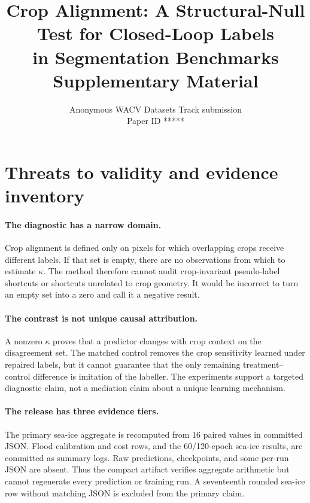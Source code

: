 \documentclass[10pt,twocolumn,letterpaper]{article}
\def\wacvPaperID{*****}
\def\confName{WACV}
\newcommand{\kap}{\kappa}
\begin{document}
\title{Crop Alignment: A Structural-Null Test for Closed-Loop Labels\\
in Segmentation Benchmarks\\
\vspace{4pt}\Large Supplementary Material}
\author{Anonymous \confName{} Datasets Track submission\\Paper ID \wacvPaperID}
\maketitle

\section{Threats to validity and evidence inventory}

\paragraph{The diagnostic has a narrow domain.} Crop alignment is defined only on
pixels for which overlapping crops receive different labels. If that set is empty,
there are no observations from which to estimate $\kap$. The method therefore
cannot audit crop-invariant pseudo-label shortcuts or shortcuts unrelated to crop
geometry. It would be incorrect to turn an empty set into a zero and call it a
negative result.

\paragraph{The contrast is not unique causal attribution.} A nonzero $\kap$ proves
that a predictor changes with crop context on the disagreement set. The matched
control removes the crop sensitivity learned under repaired labels, but it cannot
guarantee that the only remaining treatment--control difference is imitation of the
labeller. The experiments support a targeted diagnostic claim, not a mediation
claim about a unique learning mechanism.

\paragraph{The release has three evidence tiers.} The primary sea-ice aggregate is
recomputed from 16 paired values in committed JSON. Flood calibration and cost rows,
and the 60/120-epoch sea-ice results, are committed as summary logs. Raw predictions,
checkpoints, and some per-run JSON are absent. Thus the compact artifact verifies
aggregate arithmetic but cannot regenerate every prediction or training run. A
seventeenth rounded sea-ice row without matching JSON is excluded from the primary
claim.
\end{document}
